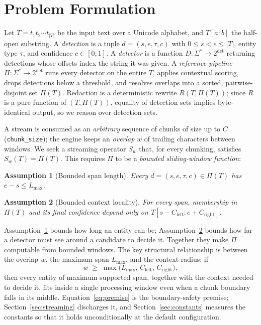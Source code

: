 \documentclass[conference]{IEEEtran}
\newtheorem{assumption}{Assumption}
\begin{document}
\section{Problem Formulation}\label{sec:problem}

Let $T=t_1t_2\cdots t_{|T|}$ be the input text over a Unicode alphabet, and
$T[a{:}b]$ the half-open substring. A \emph{detection} is a tuple
$d=(s,e,\tau,c)$ with $0\le s<e\le|T|$, entity type $\tau$, and confidence
$c\in[0,1]$. A \emph{detector} is a function $D:\Sigma^\ast\!\to\!2^{\text{det}}$
returning detections whose offsets index the string it was given. A
\emph{reference pipeline} $\Pi:\Sigma^\ast\!\to\!2^{\text{det}}$ runs every
detector on the entire $T$, applies contextual scoring, drops detections below a
threshold, and resolves overlaps into a sorted, pairwise-disjoint set $\Pi(T)$.
Redaction is a deterministic rewrite $R(T,\Pi(T))$; since $R$ is a pure function
of $(T,\Pi(T))$, equality of detection sets implies byte-identical output, so we
reason over detection sets.

A stream is consumed as an \emph{arbitrary} sequence of chunks of size up to $C$
(\texttt{chunk\_size}); the engine keeps an \emph{overlap} $w$ of trailing
characters between windows. We seek a streaming operator $S_w$ that, for every
chunking, satisfies $S_w(T)=\Pi(T)$. This requires $\Pi$ to be a
\emph{bounded sliding-window function}:

\begin{assumption}[Bounded span length]\label{as:a1}
Every $d=(s,e,\tau,c)\in\Pi(T)$ has $e-s\le L_{\max}$.
\end{assumption}
\begin{assumption}[Bounded context locality]\label{as:a2}
For every span, membership in $\Pi(T)$ and its final confidence depend only on
$T[s-C_{\mathrm{left}}:e+C_{\mathrm{right}}]$.
\end{assumption}

Assumption~\ref{as:a1} bounds how long an entity can be; Assumption~\ref{as:a2}
bounds how far a detector must see around a candidate to decide it. Together they
make $\Pi$ computable from bounded windows. The key structural relationship is
between the overlap $w$, the maximum span $L_{\max}$, and the context radius: if
\begin{equation}\label{eq:premise}
w \;\ge\; \max\bigl(L_{\max},\,C_{\mathrm{left}},\,C_{\mathrm{right}}\bigr),
\end{equation}
then every entity of maximum supported span, together with the context needed to
decide it, fits inside a single processing window even when a chunk boundary
falls in its middle. Equation~\eqref{eq:premise} is the boundary-safety premise;
Section~\ref{sec:streaming} discharges it, and Section~\ref{sec:constants}
measures the constants so that it holds unconditionally at the default
configuration.
\end{document}
